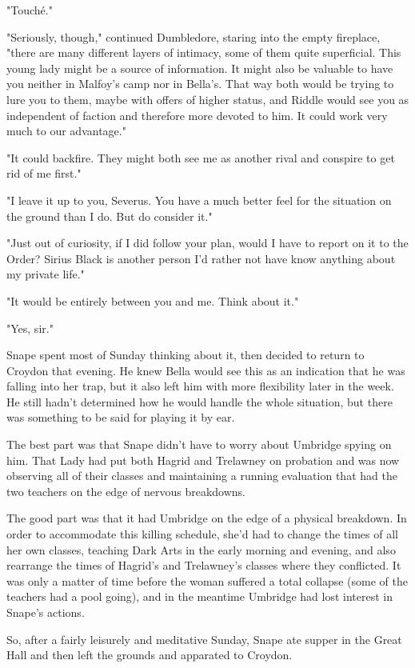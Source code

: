 "Touché."

"Seriously, though," continued Dumbledore, staring into the empty fireplace, "there are many different layers of intimacy, some of them quite superficial. This young lady might be a source of information. It might also be valuable to have you neither in Malfoy's camp nor in Bella's. That way both would be trying to lure you to them, maybe with offers of higher status, and Riddle would see you as independent of faction and therefore more devoted to him. It could work very much to our advantage."

"It could backfire. They might both see me as another rival and conspire to get rid of me first."

"I leave it up to you, Severus. You have a much better feel for the situation on the ground than I do. But do consider it."

"Just out of curiosity, if I did follow your plan, would I have to report on it to the Order? Sirius Black is another person I'd rather not have know anything about my private life."

"It would be entirely between you and me. Think about it."

"Yes, sir."

Snape spent most of Sunday thinking about it, then decided to return to Croydon that evening. He knew Bella would see this as an indication that he was falling into her trap, but it also left him with more flexibility later in the week. He still hadn't determined how he would handle the whole situation, but there was something to be said for playing it by ear.

The best part was that Snape didn't have to worry about Umbridge spying on him. That Lady had put both Hagrid and Trelawney on probation and was now observing all of their classes and maintaining a running evaluation that had the two teachers on the edge of nervous breakdowns.

The good part was that it had Umbridge on the edge of a physical breakdown. In order to accommodate this killing schedule, she'd had to change the times of all her own classes, teaching Dark Arts in the early morning and evening, and also rearrange the times of Hagrid's and Trelawney's classes where they conflicted. It was only a matter of time before the woman suffered a total collapse (some of the teachers had a pool going), and in the meantime Umbridge had lost interest in Snape's actions.

So, after a fairly leisurely and meditative Sunday, Snape ate supper in the Great Hall and then left the grounds and apparated to Croydon.

